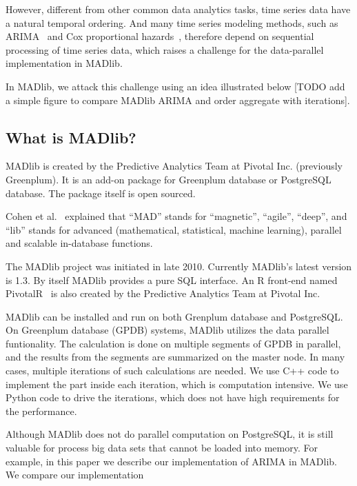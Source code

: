 \documentclass[english,10pt]{llncs}
\begin{document}
However, different from other common data analytics tasks, time series
data have a natural temporal ordering. And many time series modeling
methods, such as ARIMA~\cite{arima} and Cox proportional
hazards~\cite{cox}, therefore depend on sequential processing of time
series data, which raises a challenge for the data-parallel
implementation in MADlib.

In MADlib, we attack this challenge using an idea illustrated below
[TODO add a simple figure to compare MADlib ARIMA and order aggregate
with iterations].


\subsection{What is MADlib?}


MADlib is created by the Predictive Analytics Team at Pivotal Inc. (previously
Greenplum). It is an add-on package for Greenplum database or PostgreSQL
database. The package itself is open sourced.

Cohen et al.~\cite{mad-skills} explained that ``MAD'' stands for ``magnetic'',
``agile'', ``deep'', and ``lib'' stands for advanced (mathematical, statistical,
machine learning), parallel and scalable in-database functions.

The MADlib project was initiated in late 2010. Currently MADlib's latest
version is 1.3. By itself MADlib provides a pure SQL interface. An R
front-end named PivotalR~\cite{pivotalr} is also created by the
Predictive Analytics Team at Pivotal Inc.

MADlib can be installed and run on both Grenplum database and PostgreSQL\@. On
Greenplum database (GPDB) systems, MADlib utilizes the data parallel
funtionality. The calculation is done on multiple segments of GPDB in parallel,
and the results from the segments are summarized on the master node. In many
cases, multiple iterations of such calculations are needed. We use C++ code to
implement the part inside each iteration, which is computation intensive. We
use Python code to drive the iterations, which does not have high requirements
for the performance.

Although MADlib does not do parallel computation on PostgreSQL, it is
still valuable for process big data sets that cannot be loaded into
memory. For example, in this paper we describe our implementation of
ARIMA in MADlib. We compare our implementation 

\end{document}

